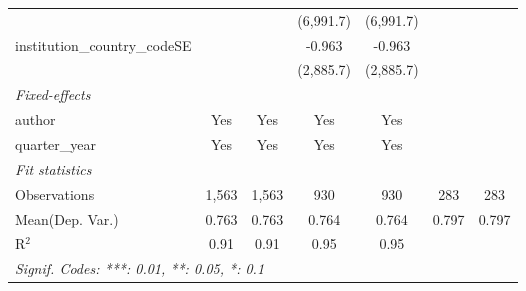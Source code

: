 \begin{tabular}{lcccccc}
                                         &                &                & (6,991.7)     & (6,991.7)     &     &   \\   
   institution\_country\_codeSE          &                &                & -0.963        & -0.963        &     &   \\   
                                         &                &                & (2,885.7)     & (2,885.7)     &     &   \\   
   \midrule
   \emph{Fixed-effects}\\
   author                                & Yes            & Yes            & Yes           & Yes           &     & \\  
   quarter\_year                         & Yes            & Yes            & Yes           & Yes           &     & \\  
   \midrule
   \emph{Fit statistics}\\
   Observations                          & 1,563          & 1,563          & 930           & 930           & 283 & 283\\  
Mean(Dep. Var.) & 0.763 & 0.763 & 0.764 & 0.764 & 0.797 & 0.797 \\
   R$^2$                                 & 0.91           & 0.91           & 0.95          & 0.95          &     & \\  
   \midrule \midrule
   \multicolumn{7}{l}{\emph{Signif. Codes: ***: 0.01, **: 0.05, *: 0.1}}\\
\end{tabular}
\par\endgroup
